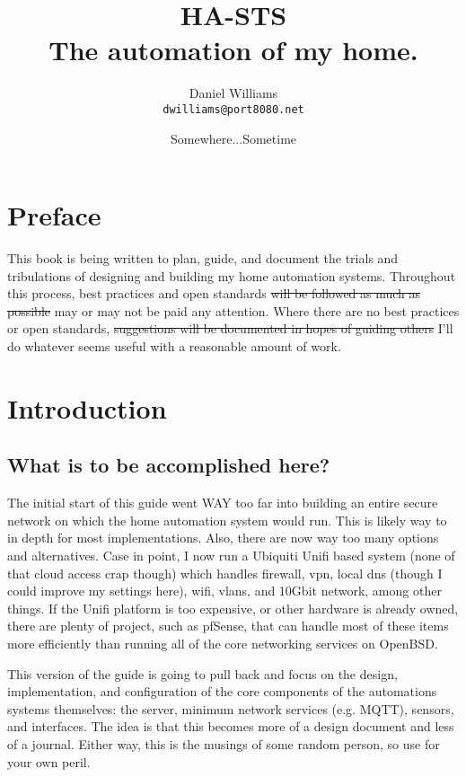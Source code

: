 \documentclass[letterpaper,twoside,12pt]{book}
\title{HA-STS \\ The automation of my home.}
\author{Daniel Williams \\ \texttt{dwilliams@port8080.net}}
\date{Somewhere...Sometime}
\begin{document}
\frontmatter
\maketitle

\chapter{Preface}
This book is being written to plan, guide, and document the trials and tribulations of designing and building my home
automation systems.  Throughout this process, best practices and open standards \sout{will be followed as much as
possible} may or may not be paid any attention.  Where there are no best practices or open standards, \sout{suggestions
will be documented in hopes of guiding others} I'll do whatever seems useful with a reasonable amount of work.

\mainmatter
\tableofcontents

\chapter{Introduction}

\section{What is to be accomplished here?}

The initial start of this guide went WAY too far into building an entire secure network on which the home automation
system would run.  This is likely way to in depth for most implementations.  Also, there are now way too many options
and alternatives.  Case in point, I now run a Ubiquiti Unifi based system (none of that cloud access crap though) which
handles firewall, vpn, local dns (though I could improve my settings here), wifi, vlans, and 10Gbit network, among other
things.  If the Unifi platform is too expensive, or other hardware is already owned, there are plenty of project, such
as pfSense, that can handle most of these items more efficiently than running all of the core networking services on
OpenBSD.

This version of the guide is going to pull back and focus on the design, implementation, and configuration of the core
components of the automations systems themselves: the server, minimum network services (e.g. MQTT), sensors, and
interfaces.  The idea is that this becomes more of a design document and less of a journal.  Either way, this is the
musings of some random person, so use for your own peril.
\end{document}
